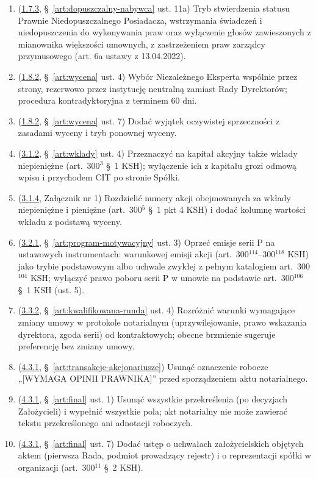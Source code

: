 \documentclass[12pt,a4paper]{report}
\begin{document}
\begin{enumerate}[label=K\arabic*.,leftmargin=2.6em]
  \item (\hyperref[memo:1.7.3]{1.7.3}, §~\ref{art:dopuszczalny-nabywca} ust. 11a) Tryb stwierdzenia statusu Prawnie Niedopuszczalnego Posiadacza, wstrzymania świadczeń i niedopuszczenia do wykonywania praw oraz wyłączenie głosów zawieszonych z mianownika większości umownych, z zastrzeżeniem praw zarządcy przymusowego (art. 6a ustawy z 13.04.2022).
  \item (\hyperref[memo:1.8.2]{1.8.2}, §~\ref{art:wycena} ust. 4) Wybór Niezależnego Eksperta wspólnie przez strony, rezerwowo przez instytucję neutralną zamiast Rady Dyrektorów; procedura kontradyktoryjna z terminem 60 dni.
  \item (\hyperref[memo:1.8.2]{1.8.2}, §~\ref{art:wycena} ust. 7) Dodać wyjątek oczywistej sprzeczności z zasadami wyceny i tryb ponownej wyceny.
  \item (\hyperref[memo:3.1.2]{3.1.2}, §~\ref{art:wklady} ust. 4) Przeznaczyć na kapitał akcyjny także wkłady niepieniężne (art.~300$^{3}$ §~1 KSH); wyłączenie ich z kapitału grozi odmową wpisu i przychodem CIT po stronie Spółki.
  \item (\hyperref[memo:3.1.4]{3.1.4}, Załącznik nr 1) Rozdzielić numery akcji obejmowanych za wkłady niepieniężne i pieniężne (art.~300$^{5}$ §~1 pkt 4 KSH) i dodać kolumnę wartości wkładu z podstawą wyceny.
  \item (\hyperref[memo:3.2.1]{3.2.1}, §~\ref{art:program-motywacyjny} ust. 3) Oprzeć emisje serii P na ustawowych instrumentach: warunkowej emisji akcji (art.~300$^{114}$–300$^{118}$ KSH) jako trybie podstawowym albo uchwale zwykłej z pełnym katalogiem art.~300$^{104}$ KSH; wyłączyć prawo poboru serii P w umowie na podstawie art.~300$^{106}$ §~1 KSH (ust. 5).
  \item (\hyperref[memo:3.3.2]{3.3.2}, §~\ref{art:kwalifikowana-runda} ust. 4) Rozróżnić warunki wymagające zmiany umowy w protokole notarialnym (uprzywilejowanie, prawo wskazania dyrektora, zgoda serii) od kontraktowych; obecne brzmienie sugeruje preferencję bez zmiany umowy.
  \item (\hyperref[memo:4.3.1]{4.3.1}, §~\ref{art:transakcje-akcjonariusze}) Usunąć oznaczenie robocze „[WYMAGA OPINII PRAWNIKA]” przed sporządzeniem aktu notarialnego.
  \item (\hyperref[memo:4.3.1]{4.3.1}, §~\ref{art:final} ust. 1) Usunąć wszystkie przekreślenia (po decyzjach Założycieli) i wypełnić wszystkie pola; akt notarialny nie może zawierać tekstu przekreślonego ani adnotacji roboczych.
  \item (\hyperref[memo:4.3.1]{4.3.1}, §~\ref{art:final} ust. 7) Dodać ustęp o uchwałach założycielskich objętych aktem (pierwsza Rada, podmiot prowadzący rejestr) i o reprezentacji spółki w organizacji (art.~300$^{11}$ §~2 KSH).
\end{enumerate}
\end{document}
